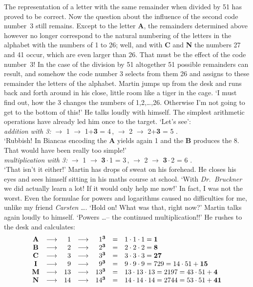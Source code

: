 The representation of a letter with the same remainder when divided by 51 has proved to be correct. 
Now the question about the influence of the second code number~3 still remains. 
Except to the letter {\bf A}, the remainders determined above however no longer correspond to the
natural numbering of the letters in the alphabet with the numbers of 1 to 26; well, and with {\bf C} 
and {\bf N} the numbers 27 and 41 occur, which are even larger than 26.
That must be the effect of the code number~3! 
In the case of the division by 51 altogether 51 possible remainders can result, and somehow the code 
number 3 selects from them 26 and assigns to these remainder the letters of the alphabet.
Martin jumps up from the desk and runs back and forth around in his close, little room like a tiger in the cage.
`I must find out, how the 3 changes the numbers of 1,2,\dots,26. 
Otherwise I'm not going to get to the bottom of this!' He talks loudly with himself. 
The simplest arithmetic operations have already led him once to the target. 
`Let's see': \\ 
{\em addition with 3:}  \(\longrightarrow \) 1 \(\longrightarrow \)
1+{\bf 3} = 4\,,  \(\longrightarrow \) 2 \(\longrightarrow \)
2+{\bf 3} = 5\,\,. \\
`Rubbish! In Biancas encoding the {\bf A} yields again 1 and the {\bf B} produces the 8. 
That would have been really too simple!' \\ 
{\em multiplication with 3:}  \(\longrightarrow \) 1
\(\longrightarrow \) {\bf 3}\,\(\cdot \)\,1 = 3\,, 
\(\longrightarrow \) 2 \(\longrightarrow \) {\bf 3}\,\(\cdot \)\,2 = 6\,\,. \\
`That isn't it either!' Martin has drops of sweat on his forehead. 
He closes his eyes and sees himself sitting in his maths course at school.
`With {\em Dr.~Bruckner \/} we did actually learn a lot! 
If it would only help me now!' 
In fact, I was not the worst. 
Even the formulae for powers and logarithms caused no difficulties for me, unlike my friend {\em Carsten\/} \dots. 
`Hold on! What was that, right now?' 
Martin talks again loudly to himself. 
`Powers \dots -- the continued multiplication!!' 
He rushes to the desk and calculates: 
\[\begin{array}{ccrcrcl}
{\bf A} & \longrightarrow & 1 & \longrightarrow & 1^{{\bf 3}} & = & 1\cdot 1
\cdot 1 = {\bf 1} \\
{\bf B} & \longrightarrow & 2 & \longrightarrow & 2^{{\bf 3}} & = & 2\cdot 2
\cdot 2 = {\bf 8} \\
{\bf C} & \longrightarrow & 3 & \longrightarrow & 3^{{\bf 3}} & = & 3\cdot 3
\cdot 3 = {\bf 27} \\
{\bf I} & \longrightarrow & 9 & \longrightarrow & 9^{{\bf 3}} & = & 9\cdot 9
\cdot 9 = 729 = 14\cdot 51 + {\bf 15} \\
{\bf M} & \longrightarrow & 13 & \longrightarrow & 13^{{\bf 3}} & = & 13\cdot 13 \cdot 13 = 2197 = 43\cdot 51 + {\bf 4} \\
{\bf N} & \longrightarrow & 14 & \longrightarrow & 14^{{\bf 3}} & = & 14\cdot
14\cdot 14 = 2744 = 53\cdot 51 + {\bf 41}
\end{array} \]
